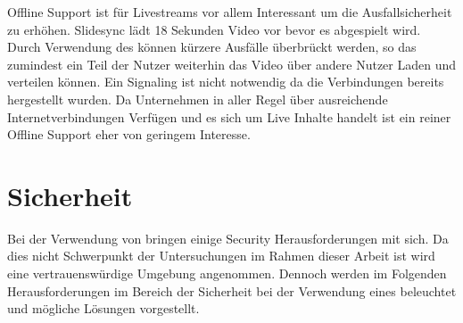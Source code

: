 Offline Support ist für Livestreams vor allem Interessant um die Ausfallsicherheit zu erhöhen. Slidesync lädt 18 Sekunden Video vor bevor es abgespielt wird. Durch Verwendung des \pTp \cdn können kürzere Ausfälle überbrückt werden, so das zumindest ein Teil der Nutzer weiterhin das Video über andere Nutzer Laden und verteilen können. Ein Signaling ist nicht notwendig da die Verbindungen bereits hergestellt wurden. Da Unternehmen in aller Regel über ausreichende Internetverbindungen Verfügen und es sich um Live Inhalte handelt ist ein reiner Offline Support eher von geringem Interesse. 


\section{Sicherheit}
Bei der Verwendung von \pTp \cdns bringen einige Security Herausforderungen mit sich. Da dies nicht Schwerpunkt der Untersuchungen im Rahmen dieser Arbeit ist wird eine vertrauenswürdige Umgebung angenommen. Dennoch werden im Folgenden Herausforderungen im Bereich der Sicherheit bei der Verwendung eines \pTp \cdns beleuchtet und mögliche Lösungen vorgestellt.

